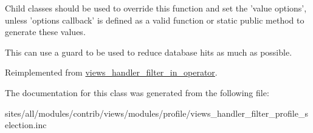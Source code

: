Child classes should be used to override this function and set the 'value options', unless 'options callback' is defined as a valid function or static public method to generate these values.

This can use a guard to be used to reduce database hits as much as possible. 

Reimplemented from \hyperlink{classviews__handler__filter__in__operator_a5b5df6d90f4359ed28c0c446bdc81a6}{views\_\-handler\_\-filter\_\-in\_\-operator}.

The documentation for this class was generated from the following file:\begin{CompactItemize}
\item 
sites/all/modules/contrib/views/modules/profile/views\_\-handler\_\-filter\_\-profile\_\-selection.inc\end{CompactItemize}
